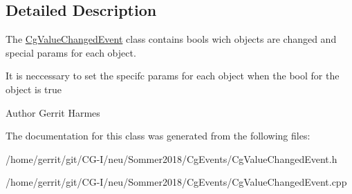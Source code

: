 \subsection{Detailed Description}
The \hyperlink{class_cg_value_changed_event}{Cg\+Value\+Changed\+Event} class contains bools wich objects are changed and special params for each object. 

It is neccessary to set the specifc params for each object when the bool for the object is true

\begin{DoxyAuthor}{Author}
Gerrit Harmes 
\end{DoxyAuthor}


The documentation for this class was generated from the following files\+:\begin{DoxyCompactItemize}
\item 
/home/gerrit/git/\+C\+G-\/\+I/neu/\+Sommer2018/\+Cg\+Events/Cg\+Value\+Changed\+Event.\+h\item 
/home/gerrit/git/\+C\+G-\/\+I/neu/\+Sommer2018/\+Cg\+Events/Cg\+Value\+Changed\+Event.\+cpp\end{DoxyCompactItemize}
